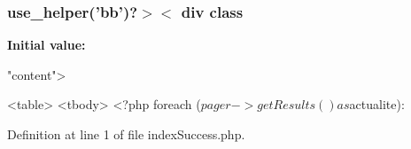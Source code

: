\hypertarget{live_2modules_2news_2templates_2index_success_8php_ad20740d877696f45a78b0497ff807965}{
\subsubsection[{use\-\_\-helper}]{\setlength{\rightskip}{0pt plus 5cm}use\-\_\-helper('bb')?$>$$<$ div {\bf class}}}\label{live_2modules_2news_2templates_2index_success_8php_ad20740d877696f45a78b0497ff807965}
{\bfseries Initial value\-:}
\begin{DoxyCode}
\textcolor{stringliteral}{"content"}>

    <table>
    <tbody>
        <?php \textcolor{keywordflow}{foreach} ($pager->getResults() as $actualite):
\end{DoxyCode}


Definition at line 1 of file index\-Success.\-php.

